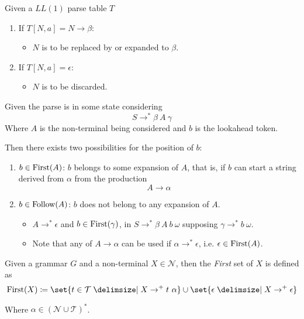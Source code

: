 \begin{definition}
    Given a $LL(1)$ parse table $T$
    \begin{enumerate}
        \item If $T[N, a] = N \to \beta$:
        \begin{itemize}
            \item $N$ is to be replaced by or expanded to $\beta$.
        \end{itemize}
        \item If $T[N, a] = \epsilon$:
        \begin{itemize}
            \item $N$ is to be discarded.
        \end{itemize}
    \end{enumerate}
\end{definition}

\begin{definition}
    Given the parse is in some state considering
    \begin{equation}
        S \to^\ast \beta\ A\ \gamma
    \end{equation}
    Where $A$ is the non-terminal being considered and $b$ is the lookahead token.
    
    Then there exists two possibilities for the position of $b$:
    \begin{enumerate}
        \item $b \in \mathrm{First}{(A)}$: $b$ belongs to some expansion of $A$, that is, if $b$ can start a string derived from $\alpha$ from the production
        \begin{equation}
            A \to \alpha
        \end{equation}
        \item $b \in \mathrm{Follow}{(A)}$: $b$ does not belong to any expansion of $A$.
        \begin{itemize}
            \item $A \to^\ast \epsilon$ and $b \in \mathrm{First}{(\gamma)}$, in $S \to^\ast \beta\ A\ b\ \omega$ supposing $\gamma \to^\ast b\ \omega$.
            \item Note that any of $A \to \alpha$ can be used if $\alpha \to^\ast \epsilon$, i.e. $\epsilon \in \mathrm{First}{(A)}$.
        \end{itemize}
    \end{enumerate}
\end{definition}

\begin{definition}
    Given a grammar $G$ and a non-terminal $X \in \mathcal{N}$, then the \textit{First} set of $X$ is defined as
    \begin{equation}
        \First{X} \coloneqq \set{t \in \mathcal{T} \given X \to^+ t\ \alpha} \cup \set{\epsilon \given X \to^+ \epsilon}
    \end{equation}
    
    Where $\alpha \in (\mathcal{N} \cup \mathcal{T})^\ast$.
\end{definition}

